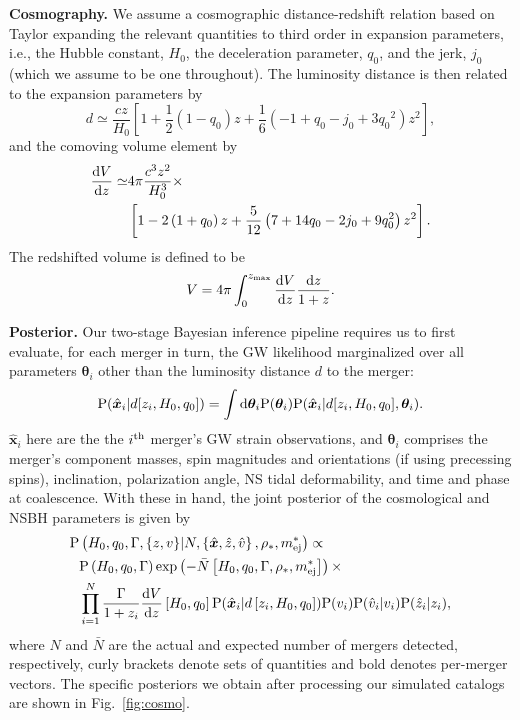 \documentclass[%
 reprint,
 superscriptaddress,
 nofootinbib,
 amsmath,amssymb,
 aps,
]{revtex4-2}
\newcommand{\hubble}{\ensuremath{H_0}}
\newcommand{\decel}{\ensuremath{q_0}}
\newcommand{\jerk}{\ensuremath{j_0}}
\newcommand{\zmax}{\ensuremath{z_{\rm max}}}
\newcommand{\prob}{\ensuremath{{\rm P}}}
\newcommand{\nexp}{\bar{N}}
\newcommand{\snrmin}{\rho_*}
\newcommand{\mejmin}{m_{\rm ej}^*}
\newcommand{\dgw}{\hat{\bm{x}}}
\begin{document}
{\bf Cosmography.} We assume a cosmographic distance-redshift relation based on Taylor expanding the relevant quantities to third order in expansion parameters, i.e., the Hubble constant, \hubble, the deceleration parameter, \decel, and the jerk, $j_0$ (which we assume to be one throughout). The luminosity distance is then related to the expansion parameters by~\cite{Visser:2004}
\begin{equation}
d \simeq \frac{cz}{\hubble} \left[1 + \frac{1}{2} \left(1 - \decel \right) z + \frac{1}{6} \left(-1 + \decel - \jerk + 3 \decel^2 \right) z^2 \right],
\label{eq:distance}
\end{equation}
and the comoving volume element by
\begin{align}
\frac{{\rm d}V}{{\rm d}z} \simeq & 4\pi \frac{c^3 z^2}{\hubble^3} \times \label{eq:volel} \\
& \left[1 - 2 \left(1 + \decel \right) z + \frac{5}{12} \left(7 + 14 \decel - 2 \jerk + 9 \decel^2 \right) z^2 \right]. \nonumber
\end{align}
The redshifted volume is defined to be 
\begin{equation}
V = 4\pi \int_0^{\zmax} \frac{{\rm d}V}{{\rm d}z} \frac{{\rm d}z}{1+z}.
\label{eq:volume}
\end{equation}

{\bf Posterior.} Our two-stage Bayesian inference pipeline requires us to first evaluate, for each merger in turn, the GW likelihood marginalized over all parameters $\boldsymbol{\theta}_i$ other than the luminosity distance $d$ to the merger:
\begin{equation}
\prob(\dgw_i | d[ z_i, \hubble, \decel ]) = \int {\rm d}\boldsymbol{\theta}_i \prob(\boldsymbol{\theta}_i) \prob(\dgw_i | d[ z_i, \hubble, \decel ], \boldsymbol{\theta}_i).
\label{eq:marge_like}
\end{equation}
$\dgw_i$ here are the the $i^{\rm th}$ merger's GW strain observations, and $\boldsymbol{\theta}_i$ comprises the merger's component masses, spin magnitudes and orientations (if using precessing spins), inclination, polarization angle, NS tidal deformability, and time and phase at coalescence. With these in hand, the joint posterior of the cosmological and NSBH parameters is given by
\begin{align}
\prob & \left( \hubble, \decel, \Gamma, \{z, v\} | N, \left\{ \dgw, \hat{z}, \hat{v} \right\}, \snrmin, \mejmin \right) \propto \label{eq:posterior} \\
& \prob \left( \hubble, \decel, \Gamma \right) \exp \left( -\bar{N} \left[ \hubble, \decel, \Gamma, \snrmin, \mejmin \right] \right) \times \nonumber \\
& \prod_{i = 1}^{N} \frac{\Gamma}{1 + z_i} \frac{{\rm d}V}{{\rm d}z} \left[ \hubble, \decel \right] \prob (\dgw_i | d \left[ z_i, \hubble, \decel \right]) \prob(v_i) \prob(\hat{v}_i | v_i) \prob(\hat{z}_i | z_i), \nonumber
\end{align}
where $N$ and $\nexp$ are the actual and expected number of mergers detected, respectively, curly brackets denote sets of quantities and bold denotes per-merger vectors. The specific posteriors we obtain after processing our simulated catalogs are shown in Fig.~\ref{fig:cosmo}.
\end{document}
